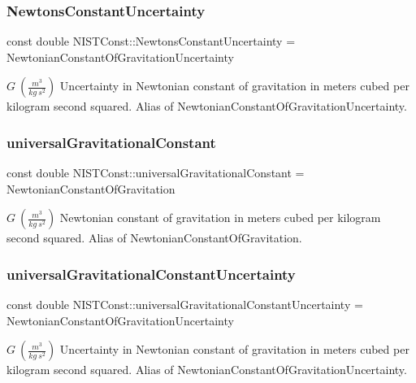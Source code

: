 \subsubsection{\texorpdfstring{Newtons\+Constant\+Uncertainty}{NewtonsConstantUncertainty}}
{\footnotesize\ttfamily const double N\+I\+S\+T\+Const\+::\+Newtons\+Constant\+Uncertainty = Newtonian\+Constant\+Of\+Gravitation\+Uncertainty}

$G \ (\frac{m^3}{kg\ s^2})$ Uncertainty in Newtonian constant of gravitation in meters cubed per kilogram second squared. Alias of Newtonian\+Constant\+Of\+Gravitation\+Uncertainty. \mbox{\label{group___n_i_s_t_const-_gravitational_constant_ga8d7552c043dbeda8e536ba6a01af9829}} 
\subsubsection{\texorpdfstring{universal\+Gravitational\+Constant}{universalGravitationalConstant}}
{\footnotesize\ttfamily const double N\+I\+S\+T\+Const\+::universal\+Gravitational\+Constant = Newtonian\+Constant\+Of\+Gravitation}

$G \ (\frac{m^3}{kg\ s^2})$ Newtonian constant of gravitation in meters cubed per kilogram second squared. Alias of Newtonian\+Constant\+Of\+Gravitation. \mbox{\label{group___n_i_s_t_const-_gravitational_constant_gaa748102f8262fa5e50c1d0090585593e}} 
\subsubsection{\texorpdfstring{universal\+Gravitational\+Constant\+Uncertainty}{universalGravitationalConstantUncertainty}}
{\footnotesize\ttfamily const double N\+I\+S\+T\+Const\+::universal\+Gravitational\+Constant\+Uncertainty = Newtonian\+Constant\+Of\+Gravitation\+Uncertainty}

$G \ (\frac{m^3}{kg\ s^2})$ Uncertainty in Newtonian constant of gravitation in meters cubed per kilogram second squared. Alias of Newtonian\+Constant\+Of\+Gravitation\+Uncertainty. 